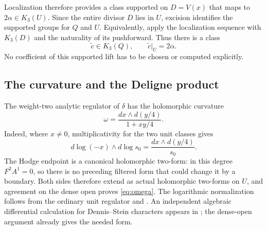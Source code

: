 \documentclass[11pt,a4paper]{article}
\theoremstyle{remark}
\begin{document}
Localization therefore provides a class supported on $D=V(x)$ that maps to $2\alpha\in K_3(U)$. Since the entire divisor $D$ lies in $U$, excision identifies the supported groups for $Q$ and $U$. Equivalently, apply the localization sequence with $K_3(D)$ and the naturality of its pushforward. Thus there is a class
\begin{equation}\label{eq:explicitlift}
\widetilde c\in K_3(Q),\qquad \widetilde c|_U=2\alpha.
\end{equation}
No coefficient of this supported lift has to be chosen or computed explicitly.

\subsection{The curvature and the Deligne product}
The weight-two analytic regulator of $\delta$ has the holomorphic curvature
\begin{equation}\label{eq:omega}
\omega=\frac{dx\wedge d(y/4)}{1+xy/4}.
\end{equation}
Indeed, where $x\neq0$, multiplicativity for the two unit classes gives
\[
d\log(-x)\wedge d\log s_0
=\frac{dx\wedge d(y/4)}{s_0}.
\]
The Hodge endpoint is a canonical holomorphic two-form: in this degree $F^2A^1=0$, so there is no preceding filtered form that could change it by a boundary. Both sides therefore extend as actual holomorphic two-forms on $U$, and agreement on the dense open proves \eqref{eq:omega}. The logarithmic normalization follows from the ordinary unit regulator and \cite[Theorem~2.31 and Lemma~4.5]{BunkeTamme}. An independent algebraic differential calculation for Dennis--Stein characters appears in \cite[Section~3.2]{Ginot}; the dense-open argument already gives the needed form.
\end{document}
